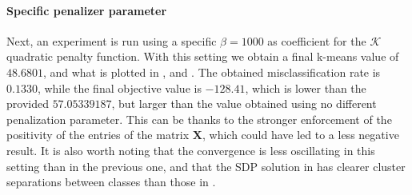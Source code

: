 \documentclass[12pt]{article}
\newcommand{\boldX}{\mathbf{X}}
\begin{document}
\paragraph{Specific penalizer parameter}
Next, an experiment is run using a specific $\beta = 1000$ as coefficient for the $\mathcal{K}$ quadratic penalty function. With this setting we obtain a final k-means value of $48.6801$, and what is plotted in ,  and . The obtained misclassification rate is $0.1330$, while the final objective value is $-128.41$, which is lower than the provided $57.05339187$, but larger than the value obtained using no different penalization parameter. This can be thanks to the stronger enforcement of the positivity of the entries of the matrix $\boldX$, which could have led to a less negative result. It is also worth noting that the convergence is less oscillating in this setting than in the previous one, and that the SDP solution in  has clearer cluster separations between classes than those in .
\end{document}
